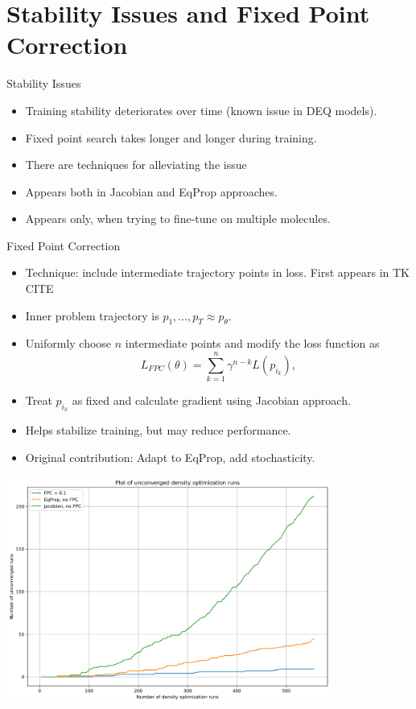 \documentclass{beamer}
\begin{document}
\section{Stability Issues and Fixed Point Correction}
\begin{frame}{Stability Issues}
  \begin{itemize}
    \item Training stability deteriorates over time (known issue in DEQ models).
    \item Fixed point search takes longer and longer during training.
    \item There are techniques for alleviating the issue
    \item Appears both in Jacobian and EqProp approaches.
    \item Appears only, when trying to fine-tune on multiple molecules.
  \end{itemize}
\end{frame}

\begin{frame}{Fixed Point Correction}
  \begin{itemize}
    \item Technique: include intermediate trajectory points in loss. First appears in TK CITE
    \item Inner problem trajectory is $p_1, \ldots, p_T \approx p_\theta$.
    \item Uniformly choose $n$ intermediate points and modify the loss function as
    \[
      L_{FPC}(\theta) = \sum_{k=1}^{n} \gamma^{n-k} L(p_{i_k}),
    \]
    \item Treat $p_{i_k}$ as fixed and calculate gradient using Jacobian approach.
    \item Helps stabilize training, but may reduce performance.
    \item Original contribution: Adapt to EqProp, add stochasticity.
  \end{itemize}

\end{frame}

\begin{frame}
   \begin{center}
    \includegraphics[width=0.8\textwidth]{images/stability_plot.png} %
  \end{center}
\end{frame}
\end{document}
